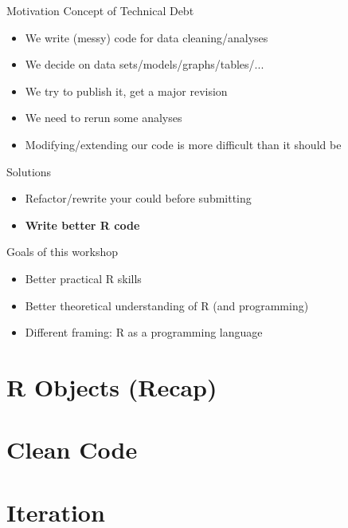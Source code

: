 \documentclass[xcolor=table]{beamer}\usepackage[]{graphicx}\usepackage[]{color}
\begin{document}
\begin{frame}{Motivation}
Concept of Technical Debt
\begin{itemize}
  \item We write (messy) code for data cleaning/analyses
  \item We decide on data sets/models/graphs/tables/...
  \item We try to publish it, get a major revision
  \item We need to rerun some analyses
  \item Modifying/extending our code is more difficult than it should be
\end{itemize}
Solutions
\begin{itemize}
  \item Refactor/rewrite your could before submitting
  \item \textbf{Write better R code}
\end{itemize}
\end{frame}

\begin{frame}{Goals of this workshop}
\begin{itemize}
  \item Better practical R skills
  \item Better theoretical understanding of R (and programming)
  \item Different framing: R as a programming language
\end{itemize}
\end{frame}


\section{R Objects (Recap)}

\section{Clean Code}

\section{Iteration}
\end{document}
